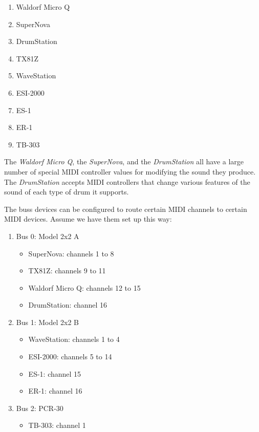    \begin{enumerate}
      \item Waldorf Micro Q
      \item SuperNova
      \item DrumStation
      \item TX81Z
      \item WaveStation
      \item ESI-2000
      \item ES-1
      \item ER-1
      \item TB-303
   \end{enumerate}

   The \textsl{Waldorf Micro Q},
   the \textsl{SuperNova},
   and the \textsl{DrumStation} all have a large
   number of special MIDI controller values for modifying the sound they
   produce.
   The \textsl{DrumStation} accepts MIDI controllers that change various
   features of the sound of each type of drum it supports.

   The buss devices can be configured to route certain
   MIDI channels to certain MIDI devices.  Assume we have them
   set up this way:

   \begin{enumerate}
      \item Bus 0: Model 2x2 A
      \begin{itemize}
         \item SuperNova: channels 1 to 8
         \item TX81Z: channels 9 to 11
         \item Waldorf Micro Q: channels 12 to 15
         \item DrumStation: channel 16
      \end{itemize}
      \item Bus 1: Model 2x2 B
      \begin{itemize}
         \item WaveStation: channels 1 to 4
         \item ESI-2000: channels 5 to 14
         \item ES-1: channel 15
         \item ER-1: channel 16
      \end{itemize}
      \item Bus 2: PCR-30
      \begin{itemize}
         \item TB-303: channel 1
      \end{itemize}
   \end{enumerate}

